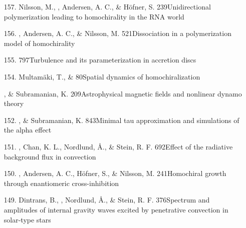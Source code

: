 \begin{itemize}
\item[{157.}]
Nilsson, M., \Brandenburg, Andersen, A. C., \&
H\"ofner, S.
{239}{Unidirectional polymerization leading to homochirality in the RNA world}

\item[{156.}]
\Brandenburg, Andersen, A. C., \& Nilsson, M.
{521}{Dissociation in a polymerization model of homochirality}

\item[{155.}]
\Brandenburg{}
{797}{Turbulence and its parameterization in accretion discs}

\item[{154.}]
Multam\"aki, T., \& \Brandenburg{}
{80}{Spatial dynamics of homochiralization}

\item[\important \relevant {153.}]
\Brandenburg, \& Subramanian, K.
{209}{Astrophysical magnetic fields and nonlinear dynamo theory}

\item[{152.}]
\Brandenburg, \& Subramanian, K.
{843}{Minimal tau approximation and simulations of the alpha effect}

\item[{151.}]
\Brandenburg, Chan, K. L., Nordlund, \AA., \& Stein, R. F.
{692}{Effect of the radiative background flux in convection}

\item[{150.}]
\Brandenburg, Andersen, A. C., H\"ofner, S., \& Nilsson, M.
{241}{Homochiral growth through enantiomeric cross-inhibition}

\item[{149.}]
Dintrans, B., \Brandenburg, Nordlund, \AA.,
\& Stein, R. F.
{376}{Spectrum and amplitudes of internal gravity waves excited by penetrative
convection in solar-type stars}


\end{itemize}
